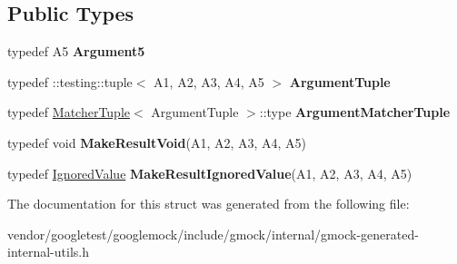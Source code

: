 \subsection*{Public Types}
\begin{DoxyCompactItemize}
\item 
\mbox{\label{structtesting_1_1internal_1_1_function_3_01_r_07_a1_00_01_a2_00_01_a3_00_01_a4_00_01_a5_08_4_a5bc0279c43aa98c409219dee1b815c71}} 
typedef A5 {\bfseries Argument5}
\item 
\mbox{\label{structtesting_1_1internal_1_1_function_3_01_r_07_a1_00_01_a2_00_01_a3_00_01_a4_00_01_a5_08_4_af5a1487829347eae2a48b2f66f216f52}} 
typedef \+::testing\+::tuple$<$ A1, A2, A3, A4, A5 $>$ {\bfseries Argument\+Tuple}
\item 
\mbox{\label{structtesting_1_1internal_1_1_function_3_01_r_07_a1_00_01_a2_00_01_a3_00_01_a4_00_01_a5_08_4_a03c18380538e53141227afe6d0f20cc8}} 
typedef \hyperlink{structtesting_1_1internal_1_1_matcher_tuple}{Matcher\+Tuple}$<$ Argument\+Tuple $>$\+::type {\bfseries Argument\+Matcher\+Tuple}
\item 
\mbox{\label{structtesting_1_1internal_1_1_function_3_01_r_07_a1_00_01_a2_00_01_a3_00_01_a4_00_01_a5_08_4_a2903acde18de33d756eef4d43d843c04}} 
typedef void {\bfseries Make\+Result\+Void}(A1, A2, A3, A4, A5)
\item 
\mbox{\label{structtesting_1_1internal_1_1_function_3_01_r_07_a1_00_01_a2_00_01_a3_00_01_a4_00_01_a5_08_4_a552ce4ec27e2d09fa1c133c66f72d7b3}} 
typedef \hyperlink{classtesting_1_1internal_1_1_ignored_value}{Ignored\+Value} {\bfseries Make\+Result\+Ignored\+Value}(A1, A2, A3, A4, A5)
\end{DoxyCompactItemize}


The documentation for this struct was generated from the following file\+:\begin{DoxyCompactItemize}
\item 
vendor/googletest/googlemock/include/gmock/internal/gmock-\/generated-\/internal-\/utils.\+h\end{DoxyCompactItemize}
